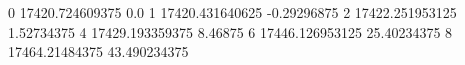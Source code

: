 0 17420.724609375 0.0
1 17420.431640625 -0.29296875
2 17422.251953125 1.52734375
4 17429.193359375 8.46875
6 17446.126953125 25.40234375
8 17464.21484375 43.490234375
